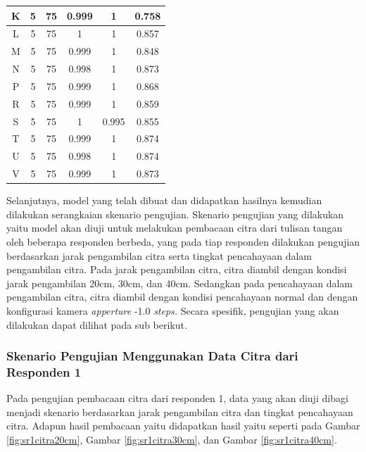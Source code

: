 \begin{center}
\begin{longtable}[c]{|c|c|c|c|c|c|}
    K      & 5      & 75     & 0.999      & 1      & 0.758    \\ \hline
    L      & 5      & 75     & 1          & 1      & 0.857    \\ \hline
    M      & 5      & 75     & 0.999      & 1      & 0.848    \\ \hline
    N      & 5      & 75     & 0.998      & 1      & 0.873    \\ \hline
    P      & 5      & 75     & 0.999      & 1      & 0.868    \\ \hline
    R      & 5      & 75     & 0.999      & 1      & 0.859    \\ \hline
    S      & 5      & 75     & 1          & 0.995  & 0.855    \\ \hline
    T      & 5      & 75     & 0.999      & 1      & 0.874    \\ \hline
    U      & 5      & 75     & 0.998      & 1      & 0.874    \\ \hline
    V      & 5      & 75     & 0.999      & 1      & 0.873    \\ \hline 
  \end{longtable}
\end{center}

Selanjutnya, model yang telah dibuat dan didapatkan hasilnya kemudian dilakukan serangkaian skenario pengujian. Skenario pengujian yang dilakukan yaitu model akan diuji untuk melakukan pembacaan citra dari tulisan tangan oleh beberapa responden berbeda, yang pada tiap responden dilakukan pengujian berdasarkan jarak pengambilan citra serta tingkat pencahayaan dalam pengambilan citra. Pada jarak pengambilan citra, citra diambil dengan kondisi jarak pengambilan 20cm, 30cm, dan 40cm. Sedangkan pada pencahayaan dalam pengambilan citra, citra diambil dengan kondisi pencahayaan normal dan dengan konfigurasi kamera \textit{apperture} -1.0 \textit{steps.} Secara spesifik, pengujian yang akan dilakukan dapat dilihat pada sub berikut.

\subsubsection{Skenario Pengujian Menggunakan Data Citra dari Responden 1}
\label{subsubsec:sskenarioresponden1}

Pada pengujian pembacaan citra dari responden 1, data yang akan diuji dibagi menjadi skenario berdasarkan jarak pengambilan citra dan tingkat pencahayaan citra. Adapun hasil pembacaan yaitu didapatkan hasil yaitu seperti pada Gambar \ref*{fig:sr1citra20cm}, Gambar \ref*{fig:sr1citra30cm}, dan Gambar \ref*{fig:sr1citra40cm}.

